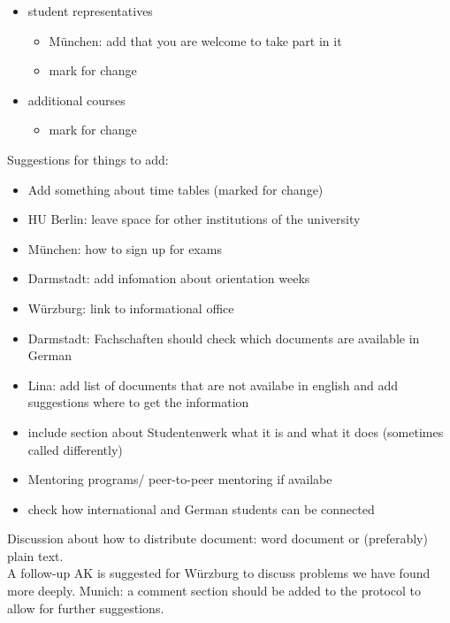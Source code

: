 \begin{itemize}
        \item student representatives
          \begin{itemize}
            \item München: add that you are welcome to take part in it
            \item mark for change
          \end{itemize}

        \item additional courses
          \begin{itemize}
            \item mark for change
          \end{itemize}
      \end{itemize}

    Suggestions for things to add:
      \begin{itemize}
        \item Add something about time tables (marked for change)
        \item HU Berlin: leave space for other institutions of the university
        \item München: how to sign up for exams
        \item Darmstadt: add infomation about orientation weeks
        \item Würzburg: link to informational office
        \item Darmstadt: Fachschaften should check which documents are available in German
        \item Lina: add list of documents that are not availabe in english and add suggestions where to get the information
        \item include section about Studentenwerk what it is and what it does (sometimes called differently)
        \item Mentoring programs/ peer-to-peer mentoring if availabe
        \item check how international and German students can be connected
      \end{itemize}

    Discussion about how to distribute document: word document or (preferably) plain text. \\

    A follow-up AK is suggested for Würzburg to discuss problems we have found more deeply.
    Munich: a comment section should be added to the protocol to allow for further suggestions.
